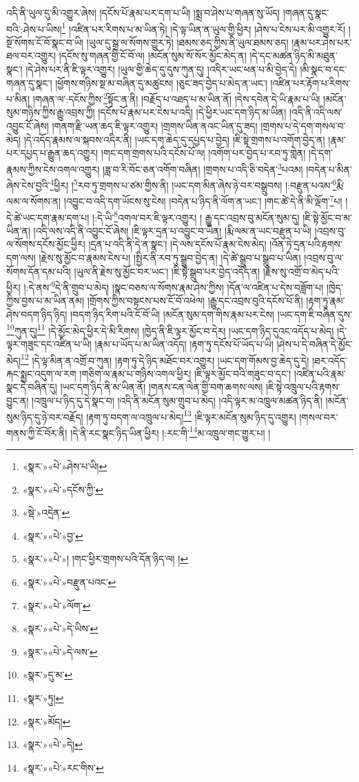 འདི་ནི་ཡུལ་དུ་མི་འགྱུར་ཞེས། །དངོས་པོ་རྣམ་པར་དག་པ་ཡི། །སྨྲ་བ་ཤེས་པ་གཞན་སུ་ཡོད། །གཞན་དུ་སྣང་བའི་:ཤེས་པ་ཡིས།\footnote{«སྣར་»«པེ་»ཤེས་པ་ཡི།} །འཛིན་པར་རིགས་པ་མ་ཡིན་ཏེ། །དེ་ལྟ་ཡིན་ན་ཡུལ་གྱི་ཕྱིར། །ཤེས་པ་ངེས་པར་མི་འགྱུར་རོ། །སྔོ་སོགས་ངོ་བོ་སྣང་བ་ཡི། །ཡུལ་དུ་སྒྲ་ལ་སོགས་གྱུར་ཏེ། །ཐམས་ཅད་ཀྱིས་ནི་ཡུལ་ཐམས་ཅད། །རྣམ་པར་ཤེས་པར་ཐལ་བར་འགྱུར། །དངོས་སུ་གཞན་གྱི་ངོ་བོ་ལ། །མངོན་སུམ་སོ་སོར་མྱོང་མེད་ན། །དེ་དང་མཚན་ཉིད་མི་མཐུན་སྣང་། །དེ་ཤེས་པར་ནི་ཇི་ལྟར་འགྱུར། །ཡུལ་གྱི་ཆེད་དུ་དུས་ཀུན་དུ། །འདིར་ཡང་ཕན་པ་མི་བྱེད་དེ། །མི་སྣང་བ་དང་གཞན་དུ་སྣང་། །ཕྱོགས་གཉིས་སྔ་མ་བཞིན་དུ་མཚུངས། །ཅུང་ཟད་བྱེད་པ་མེད་ན་ཡང་། །འཛིན་པར་རྟོག་པ་རིགས་པ་མིན། །གཞན་ལ་:དངོས་ཀྱིས་\footnote{«སྣར་»«པེ་»དངོས་ཀྱི་}སྟོང་ན་ནི། །བརྗོད་པ་འཐད་པ་མ་ཡིན་ནོ། །དེས་དབེན་དེ་ཡི་རྣམ་པ་ཡི། །མངོན་སུམ་གཉིས་ཀྱིས་རྒྱུ་འབྲས་ཀྱི། །དངོས་པོ་རྣམ་པར་ངེས་པ་འདི། །དེ་ཕྱིར་ཡང་དག་ཉིད་མ་ཡིན། །འདི་ནི་འདི་ལས་འབྱུང་ངོ་ཞེས། །གནག་རྫི་ཡན་ཆད་ཇི་ལྟར་འགྱུར། །གྲགས་ཡིན་ནའང་ཡིན་དུ་ཟད། །གྲགས་པ་དེ་དག་གསལ་བ་མེད། །དེ་འདོད་རྣམས་ལ་སྐབས་འདིར་ནི། །ཡང་དག་ཆེད་དུ་དཔྱད་པ་བྱེད། །ཇི་སྟེ་གྲགས་པ་འགོག་བྱེད་ན། །རྣམ་པར་དཔྱད་པ་རྒྱུན་ཆད་འགྱུར། །གང་དག་གྲགས་པའི་དངོས་པོ་ལ། །འགོག་པར་བྱེད་པ་རབ་ཏུ་གླེན། །དེ་དག་རྣམས་ཀྱིས་ངེས་འགལ་འགྱུར། །ཟླ་བ་རི་བོང་ཅན་འགོག་བཞིན། །གྲགས་པ་འདི་ཅི་བདེན་\footnote{«སྡེ་»འདྲེན་}པའམ། །བདེན་པ་མིན་ཞེས་ངེས་བྱའི་\footnote{«སྣར་»«པེ་»བྱ་}ཕྱིར། །\footnote{«སྣར་»«པེ་»། །གང་ཕྱིར་གྲགས་པའི་དོན་ཉིད་ལ། །}རབ་ཏུ་གྲགས་པ་ཙམ་གྱིས་ནི། །ཡང་དག་མིན་ཞེས་ཉེ་བར་བསྒྲུབས། །:བརྫུན་པའམ་\footnote{«སྣར་»«པེ་»བརྫུན་པའང་}རྨི་ལམ་ལ་སོགས་ན། །འབྱུང་བ་འདི་དག་ཡོངས་སུ་ངེས། །བདེན་པ་ཉིད་ནི་ལོག་ན་ཡང་། །གང་ཚེ་དེ་ནི་མི་ལྡོག་\footnote{«སྣར་»«པེ་»ལོག་}པ། །དེ་ཚེ་ཡང་དག་རྣམ་དག་པ། །:དེ་ཡི་\footnote{«སྣར་»«པེ་»དེ་ཡིས་}འགལ་བར་ཇི་ལྟར་འགྱུར། །
རྒྱུ་དང་འབྲས་བུ་མངོན་སུམ་དུ། །ཇི་སྟེ་མྱོང་བ་མ་ཡིན་ན། །འདི་ལས་འདི་ནི་འབྱུང་ངོ་ཞེས། །ཇི་ལྟར་དྲན་པ་འབྱུང་བ་ཡིན། །རྨི་ལམ་ན་ཡང་བརྫུན་པ་ཡི། །འབྲས་བུ་ལ་སོགས་དངོས་མྱོང་ཕྱིར། །དྲན་པ་འདི་ནི་དེ་ན་སྣང་། །དེ་ལས་དངོས་པོ་རྣམ་ངེས་མེད། །འོན་ཏེ་དྲན་པའི་རྟགས་དག་ལས། །རྗེས་སུ་མྱོང་བ་རྣམས་ངེས་པ། །སྤྱིར་ནི་རབ་ཏུ་སྒྲུབ་བྱེད་ན། །དེ་ཚེ་སྒྲུབ་པ་སྒྲུབ་པ་ཡིན། །འབྲས་བུ་ལ་སོགས་དོན་དམ་པའི། །ཡུལ་ནི་རྗེས་སུ་མྱོང་བར་ཡང་། །ཇི་སྟེ་སྒྲུབ་པར་བྱེད་འདོད་ན། །རྗེས་སུ་འགྲོ་བ་མེད་པའི་ཕྱིར། །:དེ་ནས་\footnote{«སྣར་»«པེ་»དེ་ལས་}དེ་ནི་གྲུབ་པ་མེད། །སྣང་བཅས་ལ་སོགས་རྣམ་ཤེས་ཀྱིས། །དོན་ལ་འཛིན་པ་དེས་བཟློག་པ། །ཁྱེད་ཀྱིས་བྱས་པ་མ་ཡིན་ནམ། །གྲོགས་ཀྱིས་བསྟངས་པས་ངོ་བོ་འཕེལ། །རྒྱུ་དང་འབྲས་བུའི་དངོས་པོ་ནི། །རྟག་ཏུ་རྣམ་ཤེས་བདག་ཉིད་ཉིད། །བདག་ཉིད་རིག་པའི་ངོ་བོ་ཡི། །མངོན་སུམ་དག་གིས་རྣམ་པར་ངེས། །ཡང་དག་ཇི་བཞིན་དུས་\footnote{«སྣར་»དུ་མ་}ཀུན་དུ།\footnote{«སྣར་»ཏུ།} །དེ་མྱོང་མེད་ཕྱིར་དེ་མི་རིགས། །ཁྱེད་ནི་ཇི་ལྟར་མྱོང་བ་དེར། །ཡང་དག་ཉིད་དུའང་འདོད་པ་མེད། །དེ་ལྟར་གཟུང་དང་འཛིན་པ་ཡི། །རྣམ་པ་ཡོད་པ་མ་ཡིན་འདོད། །རྟག་ཏུ་དངོས་པོ་ཡོད་པ་ཡི། །ཤེས་པ་དེ་བཞིན་དེ་མྱོང་མེད།\footnote{«སྣར་»མོད།} །དེ་ལྟ་མིན་ན་འགྲོ་བ་ཀུན། །རྟག་ཏུ་དེ་ཉིད་མཐོང་བར་འགྱུར། །ཡང་དག་གོམས་བྱ་ཆེད་དུ་དེ། །ཐར་འདོད་རྐང་སྨྱང་འདུག་ལ་རག །གཅིག་ལ་རྣམ་པ་གཉིས་འགལ་ཕྱིར། །ཇི་ལྟར་མྱོང་བའི་གཟུང་བ་དང་། །འཛིན་པའི་རྣམ་སྣང་དེ་བཞིན་དུ། །ཡང་དག་ཉིད་ནི་མ་ཡིན་ནོ། །གནས་ངན་ལེན་གྱི་བག་ཆགས་ལས། །ཇི་སྟེ་འཁྲུལ་པའི་རྟགས་བྱུང་ན། །འཁྲུལ་པ་ཉིད་དུ་དེ་སྣང་བ། །འདི་ནི་མངོན་སུམ་གྲུབ་པ་མེད། །འདི་ལྟར་མ་འཁྲུལ་མཚན་ཉིད་ནི། །མངོན་སུམ་ཉིད་དུ་ཉེ་བར་བརྗོད། །རྟག་ཏུ་བདག་ལ་འཁྲུལ་པ་མེད།\footnote{«སྣར་»«པེ་»དེ།} །ཇི་ལྟར་མངོན་སུམ་ཉིད་དུ་འགྱུར། །གསལ་བར་གནས་ཀྱི་ངོ་བོར་ནི། །དེ་ནི་རང་སྣང་ཉིད་ཡིན་ཕྱིར། །:རང་གི་\footnote{«སྣར་»«པེ་»རང་གིས་}མ་འཁྲུལ་གང་གྱུར་པ། །
